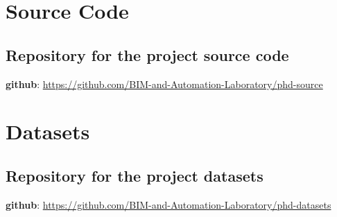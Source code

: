 \chapter{Source Code}
\section{Repository for the project source code}

\textbf{github}: \url{https://github.com/BIM-and-Automation-Laboratory/phd-source}

\chapter{Datasets}
\section{Repository for the project datasets}

\textbf{github}: \url{https://github.com/BIM-and-Automation-Laboratory/phd-datasets}